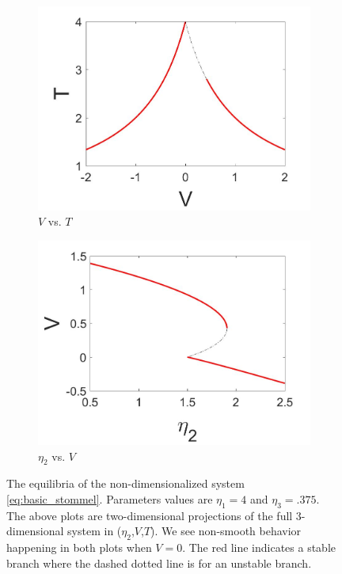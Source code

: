 \begin{figure}[H]
\centering
\begin{subfigure}{.5\textwidth}
 \centering
 \includegraphics[width=\linewidth]{intro/T_equil.jpg}
 \caption{$V$ vs. $T$}
 \label{fig:Tequil}
\end{subfigure}%
\begin{subfigure}{.5\textwidth}
 \centering
 \includegraphics[width=\linewidth]{intro/V_bif.jpg}
 \caption{$\eta_2$ vs. $V$}
 \label{fig:Vbif}
\end{subfigure}
\caption{The equilibria of the non-dimensionalized system \eqref{eq:basic_stommel}. Parameters values are $\eta_1=4$ and $\eta_3=.375$. The above plots are two-dimensional projections of the full 3-dimensional system in ($\eta_2$,$V$,$T$). We see non-smooth behavior happening in both plots when $V=0$. The red line indicates a stable branch where the dashed dotted line is for an unstable branch.}
\label{fig:systemequil}
\end{figure}


